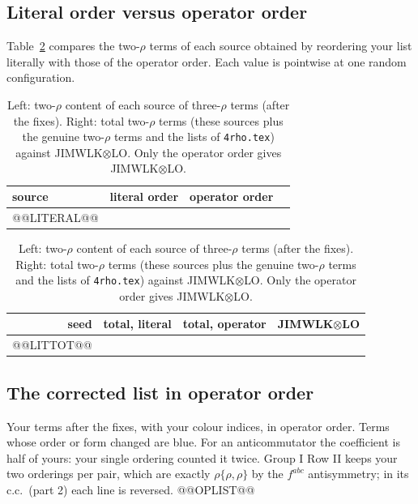 \documentclass[10pt]{article}
\numberwithin{equation}{section}
\begin{document}
\subsection{Literal order versus operator order}
Table~\ref{tab:literal} compares the two-$\rho$ terms of each source obtained by reordering your list literally with those of the operator order. Each value is pointwise at one random configuration.
\begin{table}[H]
\centering\small
\begin{tabular}{@{}l r r l@{}}
source & literal order & operator order & \\ \hline
@@LITERAL@@
\end{tabular}\qquad
\begin{tabular}{@{}r r r r@{}}
seed & total, literal & total, operator & JIMWLK$\otimes$LO\\ \hline
@@LITTOT@@
\end{tabular}
\caption{Left: two-$\rho$ content of each source of three-$\rho$ terms (after the fixes). Right: total two-$\rho$ terms (these sources plus the genuine two-$\rho$ terms and the lists of \texttt{4rho.tex}) against JIMWLK$\otimes$LO. Only the operator order gives JIMWLK$\otimes$LO.}
\label{tab:literal}
\end{table}

\subsection{The corrected list in operator order}\label{sec:oplist}
Your terms after the fixes, with your colour indices, in operator order. Terms whose order or form changed are blue. For an anticommutator the coefficient is half of yours: your single ordering counted it twice. Group I Row II keeps your two orderings per pair, which are exactly $\rho\{\rho,\rho\}$ by the $f^{abc}$ antisymmetry; in its c.c.\ (part 2) each line is reversed.
@@OPLIST@@

\end{document}
